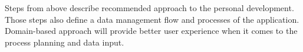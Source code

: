 Steps from above describe recommended approach to the personal development.
Those steps also define a data management flow and processes of the application.
Domain-based approach will provide better user experience when it comes to the process planning and data input.
